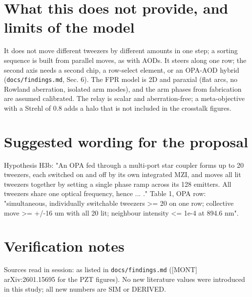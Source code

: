 \hypertarget{9-what-this-does-not-provide-and-limits-of-the-model}{%
\section{What this does not provide, and limits of the
model}\label{twenty_tweezers-9-what-this-does-not-provide-and-limits-of-the-model}}

It does not move different tweezers by different amounts in one step; a
sorting sequence is built from parallel moves, as with AODs. It steers
along one row; the second axis needs a second chip, a row-select
element, or an OPA-AOD hybrid (\texttt{docs/findings.md}, Sec. 6). The
FPR model is 2D and paraxial (flat arcs, no Rowland aberration, isolated
arm modes), and the arm phases from fabrication are assumed calibrated.
The relay is scalar and aberration-free; a meta-objective with a Strehl
of 0.8 adds a halo that is not included in the crosstalk figures.

\hypertarget{10-suggested-wording-for-the-proposal}{%
\section{Suggested wording for the
proposal}\label{twenty_tweezers-10-suggested-wording-for-the-proposal}}

Hypothesis H3b: "An OPA fed through a multi-port star coupler forms up
to 20 tweezers, each switched on and off by its own integrated MZI, and
moves all lit tweezers together by setting a single phase ramp across
its 128 emitters. All tweezers share one optical frequency, hence ... ."
Table 1, OPA row: "simultaneous, individually switchable tweezers
\textgreater= 20 on one row; collective move \textgreater= +/-16 um with
all 20 lit; neighbour intensity \textless= 1e-4 at 894.6 nm".

\hypertarget{verification-notes}{%
\section{Verification notes}\label{twenty_tweezers-verification-notes}}

Sources read in session: as listed in \texttt{docs/findings.md}
({[}MONT{]} arXiv:2601.15695 for the PZT figures). No new literature
values were introduced in this study; all new numbers are SIM or
DERIVED.

